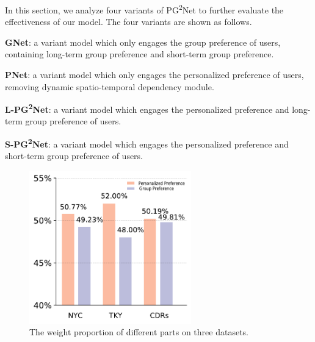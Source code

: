 \documentclass[10pt,journal,compsoc]{IEEEtran}
\begin{document}
In this section, we analyze four variants of PG\textsuperscript{2}Net to further evaluate the effectiveness of our model. The four variants are shown as follows.

\textbf{GNet}: a variant model which only engages the group preference of users, containing long-term group preference and short-term group preference.

\textbf{PNet}: a variant model which only engages the personalized preference of users, removing dynamic spatio-temporal dependency module.

\textbf{L-PG\textsuperscript{2}Net}: a variant model which engages the personalized preference and long-term group preference of users.

\textbf{S-PG\textsuperscript{2}Net}: a variant model which engages the personalized preference and short-term group preference of users.

\begin{figure}[htpb]
    \centering
    \includegraphics[width=7cm]{figure/weight1.pdf}
    \caption{The weight proportion of different parts on three datasets.}
    \label{fig.12}
\end{figure}
\end{document}
